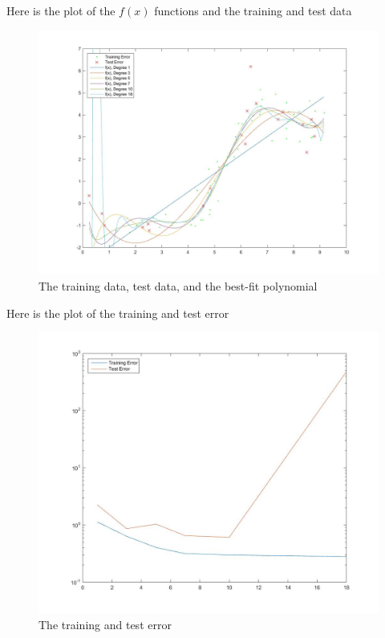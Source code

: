 \documentclass[twoside,11pt]{article}
\theoremstyle{definition}
\begin{document}

Here is the plot of the $f(x)$ functions and the training and test data
\begin{figure}[h]
\centering
\includegraphics[width=5 in]{prob1cPlotA.jpg}
\caption{The training data, test data, and the best-fit polynomial}
\end{figure}

\newpage

Here is the plot of the training and test error
\begin{figure}[h]
\centering
\includegraphics[width=5 in]{prob1cPlotB.jpg}
\caption{The training and test error}
\end{figure}
\end{document}
